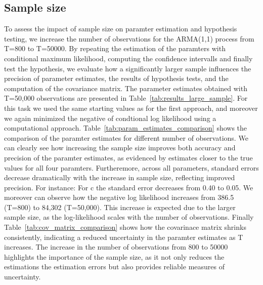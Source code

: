 \documentclass[a4paper,12pt]{article}
\begin{document}
\subsection{Sample size}
To assess the impact of sample size on paramter estimation and hypothesis testing, we increase the number of observations for the ARMA(1,1) process from T=800 to T=50000. By repeating the estimation of the paramters with conditional maximum likelihood, computing the confidence intervalls and finally test the hypothesis, we evaluate how a significantly larger sample influences the precision of parameter estimates, the results of hypothesis tests, and the computation of the covariance matrix.
The parameter estimates obtained with T=50,000 observations are presented in Table~\ref{tab:results_large_sample}.
For this task we used the same starting values as for the first approach, and moreover we again minimized the negative of condtional log likelihood using a computational approach. 
Table~\ref{tab:param_estimates_comparison} shows the comparison of the paramter estimates for different number of observations. We can clearly see how increasing the sample size improves both accuracy and precision of the paramter estimates, as evidenced by estimates closer to the true values for all four paramters. 
Furtheremore, across all parameters, standard errors decrease dramatically with the increase in sample size, reflecting improved precision. For instance: For c the standard error decreases from 0.40 to 0.05. 
We moreover can observe how the negative log likelihood increases from 386.5 (T=800) to 84,302 (T=50,000). This increase is expected due to the larger sample size, as the log-likelihood scales with the number of observations.
Finally Table~\ref{tab:cov_matrix_comparison} shows how the covarinace matrix shrinks consistently, indicating a reduced uncertainty in the paramter estimates as T increases. 
The increase in the number of observations from 800 to 50000 highlights the importance of the sample size, as it not only reduces the estimations the estimation errors but also provides reliable measures of uncertainty.
\end{document}

